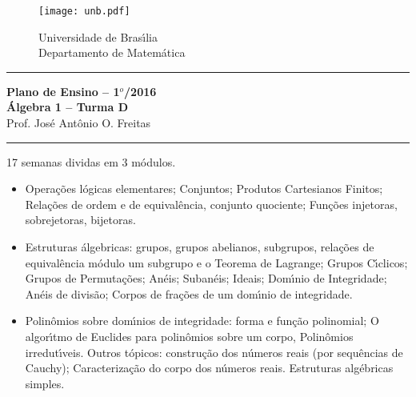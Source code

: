 \documentclass[12pt]{article}
\begin{document}
\pagestyle{empty}

\begin{figure}[h]
    \begin{minipage}[c]{1.7cm}
    \texttt{[image: unb.pdf]}
    \end{minipage}%
    \hspace{0pt}
    \begin{minipage}[c]{4in}
    {Universidade de Bras{\'\i}lia} \\
    {Departamento de Matem{\'a}tica}
    \end{minipage}
\end{figure}
\vspace{-0.9cm}
\hrule

\begin{center}
{\large\bf Plano de Ensino -- 1$^{o}$/2016} \\
{\large\bf \'Algebra 1 -- Turma D}\\
Prof. Jos{\'e} Ant{\^o}nio O. Freitas
\end{center}
\hrule
\vspace{0.25cm}
 17 semanas dividas em 3 m\'{o}dulos.
\begin{itemize}

\item Opera\c{c}\~oes l\'ogicas elementares; Conjuntos; Produtos Cartesianos Finitos; Rela\c{c}\~oes de ordem e de equival\^encia, conjunto quociente; Fun\c{c}\~oes injetoras, sobrejetoras, bijetoras.

\item Estruturas \'algebricas: grupos, grupos abelianos, subgrupos, rela\c{c}\~oes de equival\^encia m\'odulo um subgrupo e o Teorema de Lagrange; Grupos C{\'\i}clicos; Grupos de Permuta\c{c}\~oes; An\'eis; Suban\'eis; Ideais; Dom{\'\i}nio de Integridade; An\'eis de divis\~ao; Corpos de fra\c{c}\~oes de um dom{\'\i}nio de integridade.

\item Polin\^omios sobre dom{\'\i}nios de integridade: forma e fun\c{c}\~ao polinomial; O algor{\'\i}tmo de Euclides para polin\^omios sobre um corpo, Polin\^omios irredut{\'\i}veis. Outros t\'opicos: constru\c{c}\~ao dos n\'umeros reais (por sequ\^encias de Cauchy); Caracteriza\c{c}\~ao do corpo dos n\'umeros reais. Estruturas alg\'ebricas simples.
\end{itemize}
\end{document}
